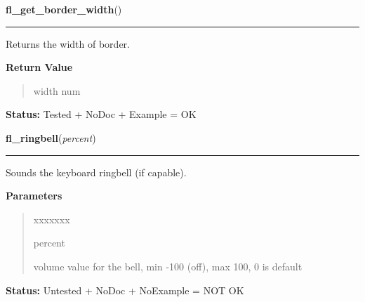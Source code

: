 \hspace{.8\funcindent}\begin{boxedminipage}{\funcwidth}

    \raggedright \textbf{fl\_get\_border\_width}()

    \vspace{-1.5ex}

    \rule{\textwidth}{0.5\fboxrule}
\setlength{\parskip}{2ex}
    Returns the width of border.

\setlength{\parskip}{1ex}
      \textbf{Return Value}
    \vspace{-1ex}

      \begin{quote}
      width num

      \end{quote}

\textbf{Status:} Tested + NoDoc + Example = OK



    \end{boxedminipage}

    \label{xformslib:library:fl_ringbell}

    \vspace{0.5ex}

\hspace{.8\funcindent}\begin{boxedminipage}{\funcwidth}

    \raggedright \textbf{fl\_ringbell}(\textit{percent})

    \vspace{-1.5ex}

    \rule{\textwidth}{0.5\fboxrule}
\setlength{\parskip}{2ex}
    Sounds the keyboard ringbell (if capable).

\setlength{\parskip}{1ex}
      \textbf{Parameters}
      \vspace{-1ex}

      \begin{quote}
        \begin{Ventry}{xxxxxxx}

          \item[percent]

          volume value for the bell, min -100 (off), max  100, 0 is default

        \end{Ventry}

      \end{quote}

\textbf{Status:} Untested + NoDoc + NoExample = NOT OK



    \end{boxedminipage}


